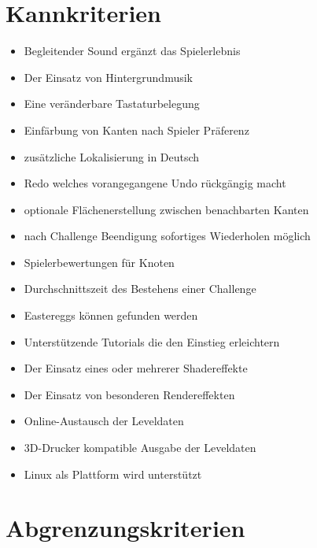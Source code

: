 \section{Kannkriterien}


\begin{itemize}
\item Begleitender Sound ergänzt das Spielerlebnis

\item Der Einsatz von Hintergrundmusik

\item Eine veränderbare Tastaturbelegung

\item Einfärbung von Kanten nach Spieler Präferenz

\item zusätzliche Lokalisierung in Deutsch

\item Redo welches vorangegangene Undo rückgängig macht

\item optionale Flächenerstellung zwischen benachbarten Kanten

\item nach Challenge Beendigung sofortiges Wiederholen möglich

\item Spielerbewertungen für Knoten

\item Durchschnittszeit des Bestehens einer Challenge

\item Eastereggs können gefunden werden

\item Unterstützende Tutorials die den Einstieg erleichtern
	
\item Der Einsatz eines oder mehrerer Shadereffekte

\item Der Einsatz von besonderen Rendereffekten 

\item Online-Austausch der Leveldaten

\item 3D-Drucker kompatible Ausgabe der Leveldaten

\item Linux als Plattform wird unterstützt
\end{itemize}

\section{Abgrenzungskriterien}


